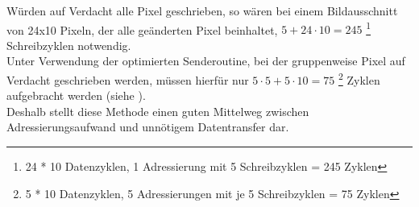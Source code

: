 Würden auf Verdacht alle Pixel geschrieben, so wären bei einem Bildausschnitt von 24x10 Pixeln, der alle geänderten Pixel beinhaltet,  $5 + 24 \cdot 10 = 245$ \footnote{24 * 10 Datenzyklen, 1 Adressierung mit 5 Schreibzyklen = 245 Zyklen} Schreibzyklen notwendig. \\
Unter Verwendung der optimierten Senderoutine, bei der gruppenweise Pixel auf Verdacht geschrieben werden, müssen hierfür nur $5 \cdot 5 + 5 \cdot 10 = 75$ \footnote{5 * 10 Datenzyklen, 5 Adressierungen mit je 5 Schreibzyklen = 75 Zyklen} Zyklen aufgebracht werden (siehe \citep{Schlegel2013a}).\\ Deshalb stellt diese Methode einen guten Mittelweg zwischen Adressierungsaufwand und unnötigem Datentransfer dar. 